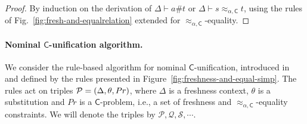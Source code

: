 \documentclass[11pt,a4paper]{amsart}
\newcommand{\caleq}{\approx_{\alpha,\theory{C}}}
\newcommand{\theory}[1]{\ensuremath{\mathsf{#1}}}
\theoremstyle{plain}
\theoremstyle{definition}
\theoremstyle{remark}
\begin{document}
\begin{proof}
By induction on the derivation of $\Delta \vdash a \# t$ or $\Delta \vdash s \caleq t$, using the rules of Fig.~\ref{fig:fresh-and-equalrelation}
extended for $\caleq$-equality.
\end{proof}

\paragraph{Nominal \theory{C}-unification algorithm.}
We consider the rule-based algorithm for nominal $\theory{C}$-unification,  introduced  in~\cite{OnSolvingNomFPequations/frocos/Washington17} and defined by the rules presented in Figure~\ref{fig:freshness-and-equal-simp}.
The rules act on triples  ${\cal P}=(\Delta, \theta, Pr)$, where $\Delta$ is a freshness context, $\theta$ is a substitution and 
$Pr$ is a \theory{C}-problem, i.e., a set of freshness and $\caleq$-equality constraints.  
We will denote the triples by $\mathcal{P}, \mathcal{Q}, \mathcal{S},\cdots$. 

\end{document}
